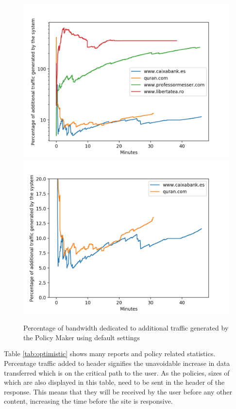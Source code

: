 \begin{description}
\begin{figure}[H]
	\centering
	\includegraphics[width=\textwidth]{imgs/netword_usage_plot.png}
	\includegraphics[width=\textwidth]{imgs/netword_usage_long_plot.png}
	\caption{Percentage of bandwidth dedicated to additional traffic generated by the Policy Maker using default settings}
	\label{fig:standarUsage}
\end{figure}

Table \ref{tab:optimistic} shows many reports and policy related statistics.
Percentage traffic added to header signifies the unavoidable increase in data transferred which is on the critical path to the user.
As the policies, sizes of which are also displayed in this table, need to be sent in the header of the response.
This means that they will be received by the user before any other content, increasing the time before the site is responsive.


\end{description}
